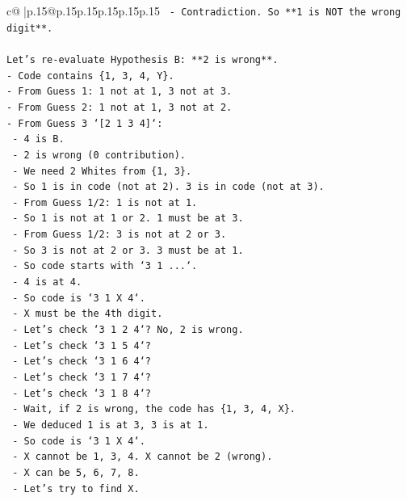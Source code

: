 \documentclass{article}
\begin{document}
{\begin{supertabular}{c@{$\;$}|p{.15\linewidth}@{}p{.15\linewidth}p{.15\linewidth}p{.15\linewidth}p{.15\linewidth}p{.15\linewidth}}
{{{\texttt{  {-} Contradiction. So **1 is NOT the wrong digit**.} \\
\\ 
\texttt{Let's re{-}evaluate Hypothesis B: **2 is wrong**.} \\
\texttt{{-} Code contains \{1, 3, 4, Y\}.} \\
\texttt{{-} From Guess 1: 1 not at 1, 3 not at 3.} \\
\texttt{{-} From Guess 2: 1 not at 1, 3 not at 2.} \\
\texttt{{-} From Guess 3 `{[}2 1 3 4{]}`:} \\
\texttt{  {-} 4 is B.} \\
\texttt{  {-} 2 is wrong (0 contribution).} \\
\texttt{  {-} We need 2 Whites from \{1, 3\}.} \\
\texttt{  {-} So 1 is in code (not at 2). 3 is in code (not at 3).} \\
\texttt{  {-} From Guess 1/2: 1 is not at 1.} \\
\texttt{  {-} So 1 is not at 1 or 2. 1 must be at 3.} \\
\texttt{  {-} From Guess 1/2: 3 is not at 2 or 3.} \\
\texttt{  {-} So 3 is not at 2 or 3. 3 must be at 1.} \\
\texttt{  {-} So code starts with `3 1 ...`.} \\
\texttt{  {-} 4 is at 4.} \\
\texttt{  {-} So code is `3 1 X 4`.} \\
\texttt{  {-} X must be the 4th digit.} \\
\texttt{  {-} Let's check `3 1 2 4`? No, 2 is wrong.} \\
\texttt{  {-} Let's check `3 1 5 4`?} \\
\texttt{  {-} Let's check `3 1 6 4`?} \\
\texttt{  {-} Let's check `3 1 7 4`?} \\
\texttt{  {-} Let's check `3 1 8 4`?} \\
\texttt{  {-} Wait, if 2 is wrong, the code has \{1, 3, 4, X\}.} \\
\texttt{  {-} We deduced 1 is at 3, 3 is at 1.} \\
\texttt{  {-} So code is `3 1 X 4`.} \\
\texttt{  {-} X cannot be 1, 3, 4. X cannot be 2 (wrong).} \\
\texttt{  {-} X can be 5, 6, 7, 8.} \\
\texttt{  {-} Let's try to find X.} \\
}}}
\end{supertabular}}
\end{document}
